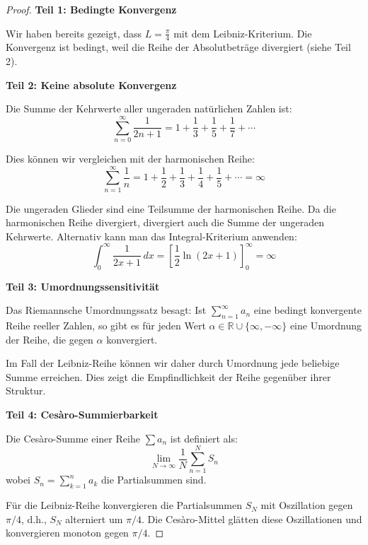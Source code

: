 \documentclass[a4paper, 12pt, twoside, openright]{report}
\theoremstyle{definition}
\theoremstyle{definition}
\begin{document}
\begin{proof}
\textbf{Teil 1: Bedingte Konvergenz}

Wir haben bereits gezeigt, dass $L = \frac{\pi}{4}$ mit dem Leibniz-Kriterium. Die Konvergenz ist bedingt, weil die Reihe der Absolutbeträge divergiert (siehe Teil 2).

\textbf{Teil 2: Keine absolute Konvergenz}

Die Summe der Kehrwerte aller ungeraden natürlichen Zahlen ist:
\begin{equation}
\sum_{n=0}^{\infty} \frac{1}{2n+1} = 1 + \frac{1}{3} + \frac{1}{5} + \frac{1}{7} + \cdots
\end{equation}

Dies können wir vergleichen mit der harmonischen Reihe:
\begin{equation}
\sum_{n=1}^{\infty} \frac{1}{n} = 1 + \frac{1}{2} + \frac{1}{3} + \frac{1}{4} + \frac{1}{5} + \cdots = \infty
\end{equation}

Die ungeraden Glieder sind eine Teilsumme der harmonischen Reihe. Da die harmonischen Reihe divergiert, divergiert auch die Summe der ungeraden Kehrwerte. Alternativ kann man das Integral-Kriterium anwenden:
\begin{equation}
\int_0^{\infty} \frac{1}{2x+1} \, dx = \left[\frac{1}{2} \ln(2x+1)\right]_0^{\infty} = \infty
\end{equation}

\textbf{Teil 3: Umordnungssensitivität}

Das Riemannsche Umordnungssatz besagt: Ist $\sum_{n=1}^{\infty} a_n$ eine bedingt konvergente Reihe reeller Zahlen, so gibt es für jeden Wert $\alpha \in \mathbb{R} \cup \{\infty, -\infty\}$ eine Umordnung der Reihe, die gegen $\alpha$ konvergiert.

Im Fall der Leibniz-Reihe können wir daher durch Umordnung jede beliebige Summe erreichen. Dies zeigt die Empfindlichkeit der Reihe gegenüber ihrer Struktur.

\textbf{Teil 4: Cesàro-Summierbarkeit}

Die Cesàro-Summe einer Reihe $\sum a_n$ ist definiert als:
\begin{equation}
\lim_{N \to \infty} \frac{1}{N} \sum_{n=1}^{N} S_n
\end{equation}
wobei $S_n = \sum_{k=1}^{n} a_k$ die Partialsummen sind.

Für die Leibniz-Reihe konvergieren die Partialsummen $S_N$ mit Oszillation gegen $\pi/4$, d.h., $S_N$ alterniert um $\pi/4$. Die Cesàro-Mittel glätten diese Oszillationen und konvergieren monoton gegen $\pi/4$.
\end{proof}
\end{document}
